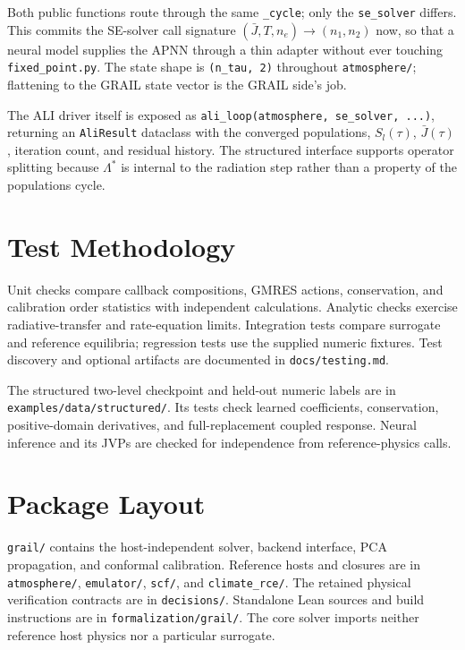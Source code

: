 \documentclass[11pt]{article}
\newcommand{\Lstar}{\Lambda^{*}}
\newcommand{\Jbar}{\bar{J}}
\newcommand{\Sl}{S_{l}}
\newcommand{\code}[1]{\texttt{#1}}
\begin{document}
Both public functions route through the same \code{\_cycle}; only the
\code{se\_solver} differs.  This commits the SE-solver call signature
$(\Jbar, T, n_e) \to (n_1, n_2)$ now, so that a neural model supplies the APNN through a thin adapter
without ever touching \code{fixed\_point.py}.  The state shape is
\code{(n\_tau, 2)} throughout \code{atmosphere/}; flattening to the
GRAIL state vector is the GRAIL side's job.

The ALI driver itself is exposed as
\code{ali\_loop(atmosphere, se\_solver, ...)}, returning an
\code{AliResult} dataclass with the converged populations, $\Sl(\tau)$,
$\Jbar(\tau)$, iteration count, and residual history.  The structured interface supports operator splitting because $\Lstar$ is internal to
the radiation step rather than a property of the populations cycle.

\section{Test Methodology}
\label{sec:tests}
Unit checks compare callback compositions, GMRES actions, conservation,
and calibration order statistics with independent calculations.
Analytic checks exercise radiative-transfer and rate-equation limits.
Integration tests compare surrogate and reference equilibria; regression
tests use the supplied numeric fixtures. Test discovery and optional
artifacts are documented in \code{docs/testing.md}.

The structured two-level checkpoint and held-out numeric labels are in
\code{examples/data/structured/}. Its tests check learned coefficients,
conservation, positive-domain derivatives, and full-replacement coupled
response. Neural inference and its JVPs are checked for independence from
reference-physics calls.

\section{Package Layout}
\label{sec:status}
\code{grail/} contains the host-independent solver, backend interface,
PCA propagation, and conformal calibration. Reference hosts and closures
are in \code{atmosphere/}, \code{emulator/}, \code{scf/}, and
\code{climate\_rce/}. The retained physical verification contracts are
in \code{decisions/}. Standalone Lean sources and build instructions
are in \code{formalization/grail/}. The core solver imports neither
reference host physics nor a particular surrogate.
\end{document}
